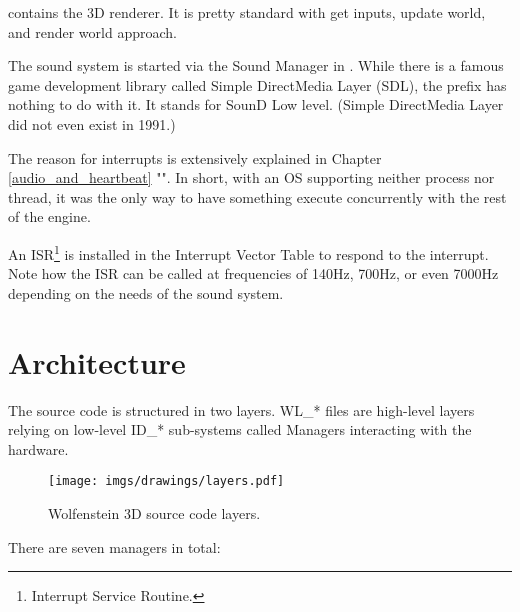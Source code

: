 \documentclass[book.tex]{subfiles}
\begin{document}
\par
\begin{minipage}{\textwidth}

\end{minipage}
\par
{} contains the 3D renderer. It is pretty standard with get inputs, update world, and render world approach.\\
\par
\begin{minipage}{\textwidth}

\end{minipage}
\par
The sound system is started via the Sound Manager in . While there is a famous game development library called Simple DirectMedia Layer (SDL), the prefix  has nothing to do with it. It stands for SounD Low level. (Simple DirectMedia Layer did not even exist in 1991.)\\
\par
The reason for interrupts is extensively explained in Chapter \ref{audio_and_heartbeat} "". In short, with an OS supporting neither process nor thread, it was the only way to have something execute concurrently with the rest of the engine.\\
\par
An ISR\footnote{Interrupt Service Routine.} is installed in the Interrupt Vector Table to respond to the interrupt. Note how the ISR can be called at frequencies of 140Hz, 700Hz, or even 7000Hz depending on the needs of the sound system.\\
\par
\begin{minipage}{\textwidth}

\end{minipage}
\par
















\section{Architecture}

The source code is structured in two layers. WL\_* files are high-level layers relying on low-level ID\_* sub-systems called Managers interacting with the hardware.\\
\par
\begin{figure}[H]
\centering
\texttt{[image: imgs/drawings/layers.pdf]} 
\caption{Wolfenstein 3D source code layers.}
 \end{figure}
 \par
There are seven managers in total:\\
\end{document}
